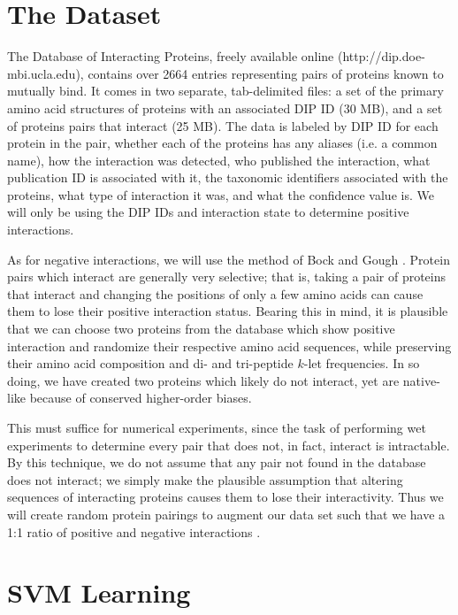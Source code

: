 \documentclass{acm_proc_article-sp}
\begin{document}
\section{The Dataset}
The Database of Interacting Proteins, freely available online (http://dip.doe-mbi.ucla.edu), contains over 2664 entries representing pairs of proteins known to mutually bind. It comes in two separate, tab-delimited files: a set of the primary amino acid structures of proteins with an associated DIP ID (30 MB), and a set of proteins pairs that interact (25 MB). The data is labeled by DIP ID for each protein in the pair, whether each of the proteins has any aliases (i.e. a common name), how the interaction was detected, who published the interaction, what publication ID is associated with it, the taxonomic identifiers associated with the proteins, what type of interaction it was, and what the confidence value is. We will only be using the DIP IDs and interaction state to determine positive interactions. 

As for negative interactions, we will use the method of Bock and Gough \cite{BockNGough}. Protein pairs which interact are generally very selective; that is, taking a pair of proteins that interact and changing the positions of only a few amino acids can cause them to lose their positive interaction status. Bearing this in mind, it is plausible that we can choose two proteins from the database which show positive interaction and randomize their respective amino acid sequences, while preserving their amino acid composition and di- and tri-peptide $k$-let frequencies. In so doing, we have created two proteins which likely do not interact, yet are native-like because of conserved higher-order biases. 

This must suffice for numerical experiments, since the task of performing wet experiments to determine every pair that does not, in fact, interact is intractable. By this technique, we do not assume that any pair not found in the database does not interact; we simply make the plausible assumption that altering sequences of interacting proteins causes them to lose their interactivity. Thus we will create random protein pairings to augment our data set such that we have a 1:1 ratio of positive and negative interactions \cite{Fitch, Needleman}.

\section{SVM Learning}
\end{document}
